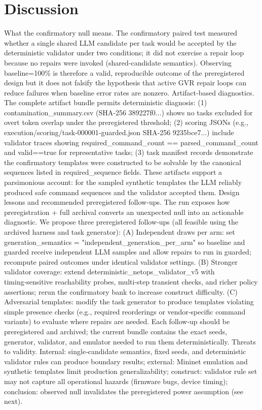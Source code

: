 \documentclass[conference]{IEEEtran}
\begin{document}
\section{Discussion}
What the confirmatory null means. The confirmatory paired test measured whether a single shared LLM candidate per task would be accepted by the deterministic validator under two conditions; it did not exercise a repair loop because no repairs were invoked (shared‑candidate semantics). Observing baseline=100\% is therefore a valid, reproducible outcome of the preregistered design but it does not falsify the hypothesis that active GVR repair loops can reduce failures when baseline error rates are nonzero. Artifact‑based diagnostics. The complete artifact bundle permits deterministic diagnosis: (1) contamination\_summary.csv (SHA‑256 389227f0...) shows no tasks excluded for overt token overlap under the preregistered threshold; (2) scoring JSONs (e.g., execution/scoring/task-000001-guarded.json SHA‑256 9235bce7...) include validator traces showing required\_command\_count == parsed\_command\_count and valid==true for representative tasks; (3) task manifest records demonstrate the confirmatory templates were constructed to be solvable by the canonical sequences listed in required\_sequence fields. These artifacts support a parsimonious account: for the sampled synthetic templates the LLM reliably produced safe command sequences and the validator accepted them. Design lessons and recommended preregistered follow‑ups. The run exposes how preregistration + full archival converts an unexpected null into an actionable diagnostic. We propose three preregistered follow‑ups (all feasible using the archived harness and task generator): (A) Independent draws per arm: set generation\_semantics = "independent\_generation\_per\_arm" so baseline and guarded receive independent LLM samples and allow repairs to run in guarded; recompute paired outcomes under identical validator settings. (B) Stronger validator coverage: extend deterministic\_netops\_validator\_v5 with timing‑sensitive reachability probes, multi‑step transient checks, and richer policy assertions; rerun the confirmatory bank to increase construct difficulty. (C) Adversarial templates: modify the task generator to produce templates violating simple presence checks (e.g., required reorderings or vendor‑specific command variants) to evaluate where repairs are needed. Each follow‑up should be preregistered and archived; the current bundle contains the exact seeds, generator, validator, and emulator needed to run them deterministically. Threats to validity. Internal: single‑candidate semantics, fixed seeds, and deterministic validator rules can produce boundary results; external: Mininet emulation and synthetic templates limit production generalizability; construct: validator rule set may not capture all operational hazards (firmware bugs, device timing); conclusion: observed null invalidates the preregistered power assumption (see next).
\end{document}
